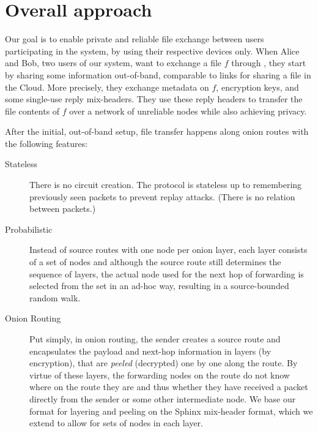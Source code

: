 \section{Overall approach}%
\label{approach}
Our goal is to enable private and reliable file exchange between users 
participating in the system, by using their respective devices only.
When Alice and Bob, two users of our system, want to exchange a file \(f\) 
through \name, they start by sharing some information out-of-band, comparable 
to links for sharing a file in the Cloud.
More precisely, they exchange metadata on \(f\), encryption keys, and
some single-use reply mix-headers.
They use these reply headers to transfer the file contents of \(f\) over a 
network of unreliable nodes while also achieving privacy.

After the initial, out-of-band setup, file transfer happens along
onion routes with the following features:\\
\begin{description}
  \item[Stateless] There is no circuit creation.
    The protocol is stateless up to remembering previously seen packets to 
    prevent replay attacks.
    (There is no relation between packets.)

  \item[Probabilistic] Instead of source routes with one node per onion layer, 
    each layer consists of a set of nodes and although the source route still 
    determines the sequence of layers, the actual node used for the next hop of 
    forwarding is selected from the set in an ad-hoc way, resulting in a source-bounded random 
    walk.

  \item[Onion Routing] Put simply, in onion routing, the sender creates a 
    source route and encapsulates the payload and next-hop information in 
    layers (by encryption), that are \emph{peeled} (decrypted) one by one along 
    the route. By virtue of these layers, the forwarding nodes on the route do 
    not know where on the route they are and thus whether they have received a 
    packet directly from the sender or some other intermediate node. We base 
    our format for layering and peeling on the \ac{Sphinx} mix-header format, 
    which we extend to allow for sets of nodes in each layer.
\end{description}


